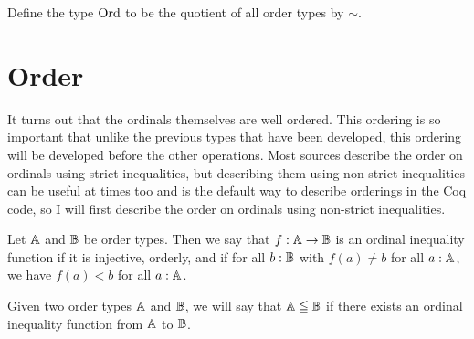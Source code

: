 \documentclass[../../math.tex]{subfiles}
\begin{document}
\begin{definition}
    Define the type $\operatorname{Ord}$ to be the quotient of all order types by $\sim$.
\end{definition}

\section{Order}

It turns out that the ordinals themselves are well ordered.  This ordering is so
important that unlike the previous types that have been developed, this ordering
will be developed before the other operations.  Most sources describe the order
on ordinals using strict inequalities, but describing them using non-strict
inequalities can be useful at times too and is the default way to describe
orderings in the Coq code, so I will first describe the order on ordinals using
non-strict inequalities.

\begin{definition}
    Let $\mathbb{A}$ and $\mathbb{B}$ be order types.  Then we say that $f : \mathbb{A} \to \mathbb{B}$ is an
    ordinal inequality function if it is injective, orderly, and if for all $b :
    \mathbb{B}$ with $f(a) \neq b$ for all $a : \mathbb{A}$, we have $f(a) < b$ for all $a :
    \mathbb{A}$.
\end{definition}

\begin{definition}
    Given two order types $\mathbb{A}$ and $\mathbb{B}$, we will say that $\mathbb{A} \leqq \mathbb{B}$ if there
    exists an ordinal inequality function from $\mathbb{A}$ to $\mathbb{B}$.
\end{definition}
\end{document}
